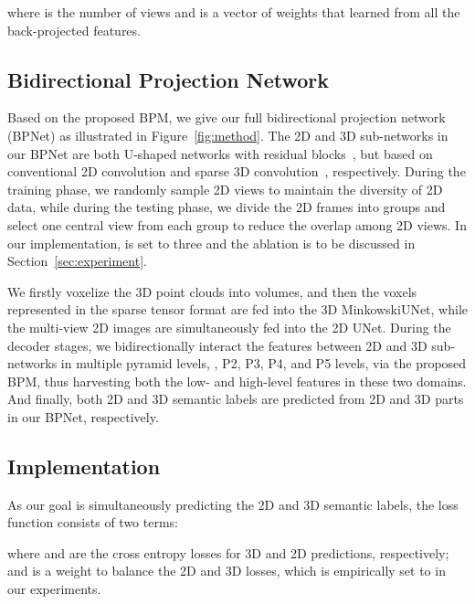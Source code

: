 \documentclass[final]{cvpr}
\begin{document}
where  is the number of views and  is a vector of weights that learned from all the back-projected features.


\subsection{Bidirectional Projection Network}
\vspace{-1mm}
Based on the proposed BPM, we give our full bidirectional projection network (BPNet) as illustrated in Figure~\ref{fig:method}. The 2D and 3D sub-networks in our BPNet are both U-shaped networks with residual blocks~\cite{he2016deep}, but based on conventional 2D convolution and sparse 3D convolution~\cite{sscn2018}, respectively. 
During the training phase, we randomly sample  2D views to maintain the diversity of 2D data, while during the testing phase, we divide the 2D frames into  groups and select one central view from each group to reduce the overlap among 2D views.
In our implementation,  is set to three and the ablation is to be discussed in Section~\ref{sec:experiment}.

We firstly voxelize the 3D point clouds into volumes, and then the voxels represented in the sparse tensor format are fed into the 3D MinkowskiUNet, while the multi-view 2D images are simultaneously fed into the 2D UNet. 
During the decoder stages, we bidirectionally interact the features between 2D and 3D sub-networks in multiple pyramid levels, \ie, P2, P3, P4, and P5 levels, via the proposed BPM, thus harvesting both the low- and high-level features in these two domains. And finally, both 2D and 3D semantic labels are predicted from 2D and 3D parts in our BPNet, respectively.


\subsection{Implementation}
\vspace{-1mm}
As our goal is simultaneously predicting the 2D and 3D semantic labels, the loss function  consists of two terms:

where  and  are the cross entropy losses for 3D and 2D predictions, respectively; and  is a weight to balance the 2D and 3D losses, which is empirically set to  in our experiments.
\end{document}

